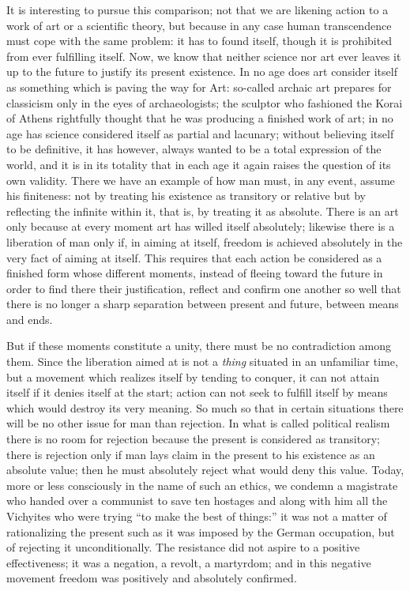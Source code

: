 \documentclass[11pt]{article}
\begin{document}
{{It is interesting to pursue this comparison; not that we are likening action to a work of art or a scientific theory, but because in any case human transcendence must cope with the same problem: it has to found itself, though it is prohibited from ever fulfilling itself. Now, we know that neither science nor art ever leaves it up to the future to justify its present existence. In no age does art consider itself as something which is paving the way for Art: so-called archaic art prepares for classicism only in the eyes of archaeologists; the sculptor who fashioned the Korai of Athens rightfully thought that he was producing a finished work of art; in no age has science considered itself as partial and lacunary; without believing itself to be definitive, it has however, always wanted to be a total expression of the world, and it is in its totality that in each age it again raises the question of its own validity. There we have an example of how man must, in any event, assume his finiteness: not by treating his existence as transitory or relative but by reflecting the infinite within it, that is, by treating it as absolute. There is an art only because at every moment art has willed itself absolutely; likewise there is a liberation of man only if, in aiming at itself, freedom is achieved absolutely in the very fact of aiming at itself. This requires that each action be considered as a finished form whose different moments, instead of fleeing toward the future in order to find there their justification, reflect and confirm one another so well that there is no longer a sharp separation between present and future, between means and ends.

But if these moments constitute a unity, there must be no contradiction among them. Since the liberation aimed at is not a \textit{thing} situated in an unfamiliar time, but a movement which realizes itself by tending to conquer, it can not attain itself if it denies itself at the start; action can not seek to fulfill itself by means which would destroy its very meaning. So much so that in certain situations there will be no other issue for man than rejection. In what is called political realism there is no room for rejection because the present is considered as transitory; there is rejection only if man lays claim in the present to his existence as an absolute value; then he must absolutely reject what would deny this value. Today, more or less consciously in the name of such an ethics, we condemn a magistrate who handed over a communist to save ten hostages and along with him all the Vichyites who were trying “to make the best of things:” it was not a matter of rationalizing the present such as it was imposed by the German occupation, but of rejecting it unconditionally. The resistance did not aspire to a positive effectiveness; it was a negation, a revolt, a martyrdom; and in this negative movement freedom was positively and absolutely confirmed.

}}
\end{document}
